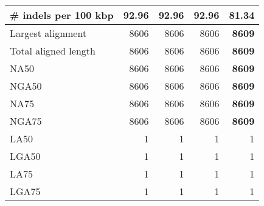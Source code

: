 \documentclass[12pt,a4paper]{article}
\begin{document}
\begin{table}[ht]
\begin{center}
\begin{tabular}{|l*{4}{|r}|}
\# indels per 100 kbp & 92.96 & 92.96 & 92.96 & {\bf 81.34} \\ \hline
Largest alignment & 8606 & 8606 & 8606 & {\bf 8609} \\ \hline
Total aligned length & 8606 & 8606 & 8606 & {\bf 8609} \\ \hline
NA50 & 8606 & 8606 & 8606 & {\bf 8609} \\ \hline
NGA50 & 8606 & 8606 & 8606 & {\bf 8609} \\ \hline
NA75 & 8606 & 8606 & 8606 & {\bf 8609} \\ \hline
NGA75 & 8606 & 8606 & 8606 & {\bf 8609} \\ \hline
LA50 & 1 & 1 & 1 & 1 \\ \hline
LGA50 & 1 & 1 & 1 & 1 \\ \hline
LA75 & 1 & 1 & 1 & 1 \\ \hline
LGA75 & 1 & 1 & 1 & 1 \\ \hline
\end{tabular}
\end{center}
\end{table}
\end{document}
